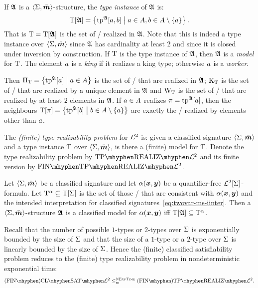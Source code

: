 If $\mathfrak{A}$ is a $\left\langle \mathrm{\Sigma},\bar{\bm{m}} \right\rangle$-structure, the \emph{type instance} of $\mathfrak{A}$
is:
\[
  \mathrm{T}[\mathfrak{A}] = \left\{\operatorname{tp}^{\mathfrak{A}}[a,b]\mathrel{}\middle|\mathrel{}
    a \in A, b \in A \setminus\left\{a\right\}\right\}.
\]
That is $\mathrm{T} = \mathrm{T}[\mathfrak{A}]$ is the set of \twotypes/ realized in $\mathfrak{A}$.
Note that this is indeed a type instance over $\left\langle \mathrm{\Sigma},\bar{\bm{m}} \right\rangle$ since $\mathfrak{A}$
has cardinality at least $2$ and since it is closed under inversion by
construction.
If $\mathrm{T}$ is the type instance of $\mathfrak{A}$, then $\mathfrak{A}$ is a \emph{model} for
$\mathrm{T}$.
The element $a$ is a \emph{king} if it realizes a king type; otherwise $a$
is a \emph{worker}.

\begin{remark}\label{rem:type-char}
Then ${\Pi}_{\mathrm{T}} = \left\{\operatorname{tp}^{\mathfrak{A}}[a]\mathrel{}\middle|\mathrel{}a\in A\right\}$ is the set of \onetypes/ that
are realized in $\mathfrak{A}$; ${\mathrm{K}}_{\mathrm{T}}$ is the set of \onetypes/ that are realized by a unique element in
$\mathfrak{A}$ and ${\mathrm{W}}_{\mathrm{T}}$ is the set of \onetypes/ that are realized by at least $2$
elements in $\mathfrak{A}$.
If $a \in A$ realizes $\pi=\operatorname{tp}^{\mathfrak{A}}[a]$, then the neighbours
$\mathrm{T}[\pi] = \left\{\operatorname{tp}^{\mathfrak{A}}[b]\mathrel{}\middle|\mathrel{}b \in A \setminus \left\{a\right\}\right\}$ are exactly the
\onetypes/ realized by elements other than $a$.
\end{remark}

\begin{definition}
The \emph{(finite) type realizability problem} for $\mathcal{L}^{2}$ is: given a
classified signature $\left\langle \mathrm{\Sigma},\bar{\bm{m}} \right\rangle$ and a type instance $\mathrm{T}$ over
$\left\langle \mathrm{\Sigma},\bar{\bm{m}} \right\rangle$, is there a (finite) model for $\mathrm{T}$.
Denote the type realizability problem by $\Real{\vFo2}$ and its finite version
by $\FinReal{\vFo2}$.
\end{definition}

\begin{remark}\label{rem:red-sat-to-real}
Let $\left\langle \mathrm{\Sigma},\bar{\bm{m}} \right\rangle$ be a classified signature and let $\alpha(\bm{x},\bm{y})$ be a
quantifier-free $\mathcal{L}^{2}[\mathrm{\Sigma}]$-formula.
Let $\mathrm{T}^\alpha \subseteq \mathrm{T}[\mathrm{\Sigma}]$ is the set of those \twotypes/ that are
consistent with $\alpha(\bm{x},\bm{y})$ and the intended interpretation
for classified signatures~\cref{eq:twovar-ms-iinter}.
Then a $\left\langle \mathrm{\Sigma},\bar{\bm{m}} \right\rangle$-structure $\mathfrak{A}$ is a classified model for
$\alpha(\bm{x},\bm{y})$ iff $\mathrm{T}[\mathfrak{A}] \subseteq \mathrm{T}^\alpha$.

Recall that the number of possible $1$-types or $2$-types over $\mathrm{\Sigma}$ is
exponentially bounded by the size of $\mathrm{\Sigma}$ and that the size of a $1$-type or
a $2$-type over $\mathrm{\Sigma}$ is linearly bounded by the size of $\mathrm{\Sigma}$.
Hence the (finite) classified satisfiability problem reduces to the
(finite) type realizability problem in nondeterministic exponential time:
\[
  \FinAClSat{\vFo2} \red\cNExpTime \FinAReal{\vFo2}.
\]
\end{remark}

